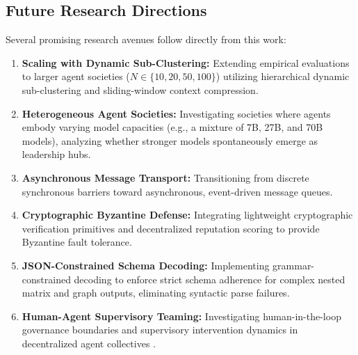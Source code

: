 \documentclass{ieeeaccess}
\begin{document}
\subsection{Future Research Directions}
Several promising research avenues follow directly from this work:
\begin{enumerate}
    \item \textbf{Scaling with Dynamic Sub-Clustering:} Extending empirical evaluations to larger agent societies ($N \in \{10, 20, 50, 100\}$) utilizing hierarchical dynamic sub-clustering and sliding-window context compression.
    \item \textbf{Heterogeneous Agent Societies:} Investigating societies where agents embody varying model capacities (e.g., a mixture of 7B, 27B, and 70B models), analyzing whether stronger models spontaneously emerge as leadership hubs.
    \item \textbf{Asynchronous Message Transport:} Transitioning from discrete synchronous barriers toward asynchronous, event-driven message queues.
    \item \textbf{Cryptographic Byzantine Defense:} Integrating lightweight cryptographic verification primitives and decentralized reputation scoring to provide Byzantine fault tolerance.
    \item \textbf{JSON-Constrained Schema Decoding:} Implementing grammar-constrained decoding to enforce strict schema adherence for complex nested matrix and graph outputs, eliminating syntactic parse failures.
    \item \textbf{Human-Agent Supervisory Teaming:} Investigating human-in-the-loop governance boundaries and supervisory intervention dynamics in decentralized agent collectives \cite{mosquera2026human}.
\end{enumerate}
\end{document}
